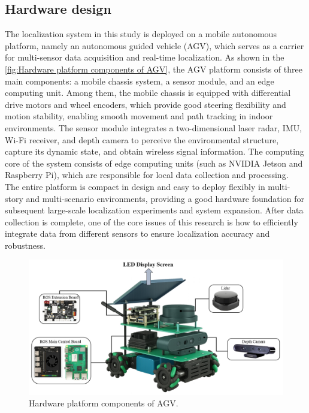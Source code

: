 \documentclass[12pt,a4paper]{article}
\numberwithin{equation}{section}
\begin{document}
\subsection{Hardware design}
The localization system in this study is deployed on a mobile autonomous platform, namely an autonomous guided vehicle (AGV), which serves as a carrier for multi-sensor data acquisition and real-time localization. As shown in the \autoref{fig:Hardware platform components of AGV}, the AGV platform consists of three main components: a mobile chassis system, a sensor module, and an edge computing unit. Among them, the mobile chassis is equipped with differential drive motors and wheel encoders, which provide good steering flexibility and motion stability, enabling smooth movement and path tracking in indoor environments. The sensor module integrates a two-dimensional laser radar, IMU, Wi-Fi receiver, and depth camera to perceive the environmental structure, capture its dynamic state, and obtain wireless signal information. The computing core of the system consists of edge computing units (such as NVIDIA Jetson and Raspberry Pi), which are responsible for local data collection and processing.\\
\noindent The entire platform is compact in design and easy to deploy flexibly in multi-story and multi-scenario environments, providing a good hardware foundation for subsequent large-scale localization experiments and system expansion. After data collection is complete, one of the core issues of this research is how to efficiently integrate data from different sensors to ensure localization accuracy and robustness.
\begin{figure}[H]
    \centering
    \includegraphics[width=0.95\linewidth]{images/Hardware.png}
    \caption{Hardware platform components of AGV.}
    \label{fig:Hardware platform components of AGV}
\end{figure}
\end{document}
